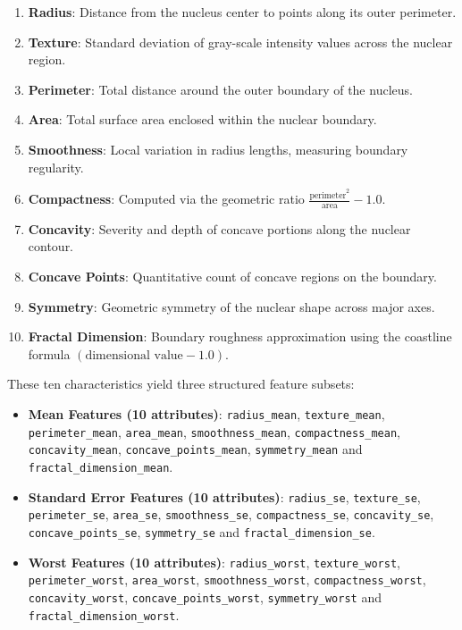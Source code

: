 \documentclass[12pt,a4paper]{article}
\begin{document}
\begin{enumerate}
\item \textbf{Radius}: Distance from the nucleus center to points along its outer perimeter.
\item \textbf{Texture}: Standard deviation of gray-scale intensity values across the nuclear region.
\item \textbf{Perimeter}: Total distance around the outer boundary of the nucleus.
\item \textbf{Area}: Total surface area enclosed within the nuclear boundary.
\item \textbf{Smoothness}: Local variation in radius lengths, measuring boundary regularity.
\item \textbf{Compactness}: Computed via the geometric ratio $\frac{\text{perimeter}^2}{\text{area}} - 1.0$.
\item \textbf{Concavity}: Severity and depth of concave portions along the nuclear contour.
\item \textbf{Concave Points}: Quantitative count of concave regions on the boundary.
\item \textbf{Symmetry}: Geometric symmetry of the nuclear shape across major axes.
\item \textbf{Fractal Dimension}: Boundary roughness approximation using the coastline formula $(\text{dimensional value} - 1.0)$.
\end{enumerate}

These ten characteristics yield three structured feature subsets:
\begin{itemize}
\item \textbf{Mean Features (10 attributes)}: \texttt{radius\_mean}, \texttt{texture\_mean}, \texttt{perimeter\_mean}, \texttt{area\_mean}, \texttt{smoothness\_mean}, \texttt{compactness\_mean}, \texttt{concavity\_mean}, \texttt{concave\_points\_mean}, \texttt{symmetry\_mean} and \texttt{fractal\_dimension\_mean}.
\item \textbf{Standard Error Features (10 attributes)}: \texttt{radius\_se}, \texttt{texture\_se}, \texttt{perimeter\_se}, \texttt{area\_se}, \texttt{smoothness\_se}, \texttt{compactness\_se}, \texttt{concavity\_se}, \texttt{concave\_points\_se}, \texttt{symmetry\_se} and \texttt{fractal\_dimension\_se}.
\item \textbf{Worst Features (10 attributes)}: \texttt{radius\_worst}, \texttt{texture\_worst}, \texttt{perimeter\_worst}, \texttt{area\_worst}, \texttt{smoothness\_worst}, \texttt{compactness\_worst}, \texttt{concavity\_worst}, \texttt{concave\_points\_worst}, \texttt{symmetry\_worst} and \texttt{fractal\_dimension\_worst}.
\end{itemize}
\end{document}
